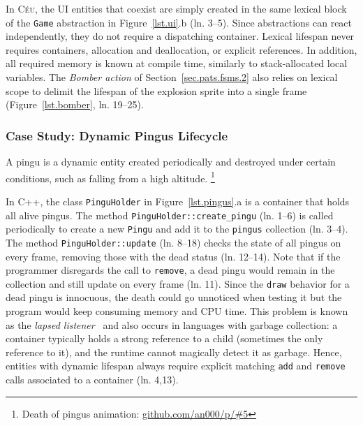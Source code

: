 \documentclass{vgtc}                          %
\newcommand{\CEU}{\textsc{C\'{e}u}\xspace}
\newcommand{\code}[1] {{\small{\texttt{#1}}}}
\begin{document}
In \CEU, the UI entities that coexist are simply created in the same lexical
block of the \code{Game} abstraction in Figure~\ref{lst.ui}.b (ln. 3--5).
%
Since abstractions can react independently, they do not require a dispatching
container.
%
Lexical lifespan never requires containers, allocation and deallocation, or
explicit references.
In addition, all required memory is known at compile time, similarly to
stack-allocated local variables.
%
The \emph{Bomber action} of Section~\ref{sec.pats.fsms.2} also relies on
lexical scope to delimit the lifespan of the explosion sprite into a single
frame (Figure~\ref{lst.bomber}, ln. 19--25).

\subsubsection{Case Study: Dynamic Pingus Lifecycle}
\label{sec.pats.lifespan.2}


A pingu is a dynamic entity created periodically and destroyed under certain
conditions, such as falling from a high altitude.%
\footnote{Death of pingus animation: \url{github.com/an000/p/#5} }
%

In C++, the class \code{PinguHolder} in Figure~\ref{lst.pingus}.a is a
container that holds all alive pingus.
%
The method \code{PinguHolder::create\_pingu} (ln. 1--6) is called periodically
to create a new \code{Pingu} and add it to the \code{pingus} collection
(ln. 3--4).
The method \code{PinguHolder::update} (ln. 8--18) checks the state of all
pingus on every frame, removing those with the dead status (ln. 12--14).
%
Note that if the programmer disregards the call to \code{remove}, a dead pingu
would remain in the collection and still update on every frame (ln. 11).
Since the \code{draw} behavior for a dead pingu is innocuous, the death could
go unnoticed when testing it but the program would keep consuming memory and
CPU time.
%
This problem is known as the \emph{lapsed listener}~\cite{games.patterns} and
also occurs in languages with garbage collection:
a container typically holds a strong reference to a child (sometimes the only 
reference to it), and the runtime cannot magically detect it as garbage.
%
Hence, entities with dynamic lifespan always require explicit matching
\code{add} and \code{remove} calls associated to a container (ln. 4,13).
\end{document}
